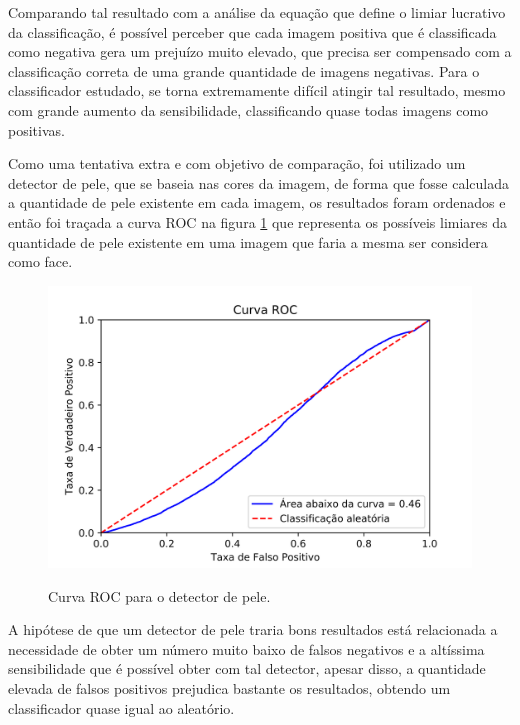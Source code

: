 Comparando tal resultado com a análise da equação que define o limiar lucrativo da classificação, é possível perceber que cada imagem positiva que é classificada como negativa gera um prejuízo muito elevado, que precisa ser compensado com a classificação correta de uma grande quantidade de imagens negativas. Para o classificador estudado, se torna extremamente difícil atingir tal resultado, mesmo com grande aumento da sensibilidade, classificando quase todas imagens como positivas.

Como uma tentativa extra e com objetivo de comparação, foi utilizado um detector de pele, que se baseia nas cores da imagem, de forma que fosse calculada a quantidade de pele existente em cada imagem, os resultados foram ordenados e então foi traçada a curva ROC na figura \ref{fig:skin_roc} que representa os possíveis limiares da quantidade de pele existente em uma imagem que faria a mesma ser considera como face.

\begin{figure}[htbp]
     \centering
     \caption{Curva ROC para o detector de pele.}
     \includegraphics[scale=1]{figs/curva_roc_skin.png}
     \label{fig:skin_roc}
 \end{figure}

A hipótese de que um detector de pele traria bons resultados está relacionada a necessidade de obter um número muito baixo de falsos negativos e a altíssima sensibilidade que é possível obter com tal detector, apesar disso, a quantidade elevada de falsos positivos prejudica bastante os resultados, obtendo um classificador quase igual ao aleatório.

